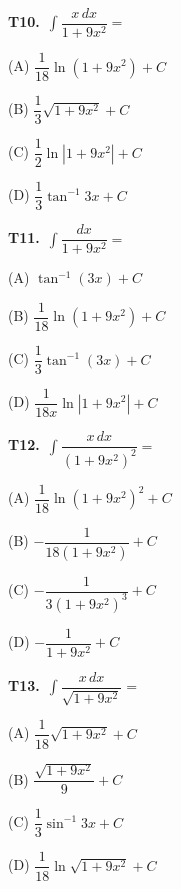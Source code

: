 \documentclass[11pt]{article}
\begin{document}
\bigskip\noindent\textbf{T10.}\ $\displaystyle\int \dfrac{x\,dx}{1+9x^2} =$
\begin{list}{}{\setlength{\leftmargin}{3em}\setlength{\labelwidth}{2.5em}\setlength{\itemsep}{0pt}\setlength{\topsep}{2pt}}
\item[(A)] $\dfrac{1}{18}\ln(1+9x^2)+C$
\item[(B)] $\dfrac{1}{3}\sqrt{1+9x^2}+C$
\item[(C)] $\dfrac{1}{2}\ln|1+9x^2|+C$
\item[(D)] $\dfrac{1}{3}\tan^{-1}3x+C$
\end{list}

\bigskip\noindent\textbf{T11.}\ $\displaystyle\int \dfrac{dx}{1+9x^2} =$
\begin{list}{}{\setlength{\leftmargin}{3em}\setlength{\labelwidth}{2.5em}\setlength{\itemsep}{0pt}\setlength{\topsep}{2pt}}
\item[(A)] $\tan^{-1}(3x)+C$
\item[(B)] $\dfrac{1}{18}\ln(1+9x^2)+C$
\item[(C)] $\dfrac{1}{3}\tan^{-1}(3x)+C$
\item[(D)] $\dfrac{1}{18x}\ln|1+9x^2|+C$
\end{list}

\bigskip\noindent\textbf{T12.}\ $\displaystyle\int \dfrac{x\,dx}{(1+9x^2)^2} =$
\begin{list}{}{\setlength{\leftmargin}{3em}\setlength{\labelwidth}{2.5em}\setlength{\itemsep}{0pt}\setlength{\topsep}{2pt}}
\item[(A)] $\dfrac{1}{18}\ln(1+9x^2)^2+C$
\item[(B)] $-\dfrac{1}{18(1+9x^2)}+C$
\item[(C)] $-\dfrac{1}{3(1+9x^2)^3}+C$
\item[(D)] $-\dfrac{1}{1+9x^2}+C$
\end{list}

\bigskip\noindent\textbf{T13.}\ $\displaystyle\int \dfrac{x\,dx}{\sqrt{1+9x^2}} =$
\begin{list}{}{\setlength{\leftmargin}{3em}\setlength{\labelwidth}{2.5em}\setlength{\itemsep}{0pt}\setlength{\topsep}{2pt}}
\item[(A)] $\dfrac{1}{18}\sqrt{1+9x^2}+C$
\item[(B)] $\dfrac{\sqrt{1+9x^2}}{9}+C$
\item[(C)] $\dfrac{1}{3}\sin^{-1}3x+C$
\item[(D)] $\dfrac{1}{18}\ln\sqrt{1+9x^2}+C$
\end{list}
\end{document}
